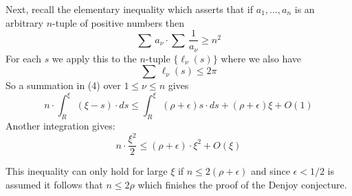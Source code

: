 \documentclass{amsart}
\def\uuu{_}
\def\vvv{-}
\begin{document}
\noindent
Next, recall the elementary inequality which asserts that if $a\uuu 1,\ldots,a\uuu n$
is an arbitrary $n$\vvv tuple of positive numbers then
\[
\sum\,a\uuu \nu\cdot \sum\, \frac{1}{a_\nu}\geq n^2
\tag{5}
\]
For each $s$ we apply this to the $n$\vvv tuple
$\{\ell\uuu \nu(s)\}$ where we also have
\[ 
\sum\,\ell\uuu \nu(s)\leq 2\pi
\] 
\noindent
So  a summation in (4) over $1\leq \nu\leq n$ gives
\[
n\cdot  \int_R^\xi\, (\xi-s)\cdot ds\leq
\int_R^\xi\, (\rho+\epsilon)s\cdot ds+(\rho+\epsilon)\xi+O(1)\tag{6}
\]
Another integration gives:
\[ 
n\cdot\frac{\xi^2}{2}\leq (\rho+\epsilon)\cdot \xi^2+O(\xi)\tag{7}
\]
\medskip

\noindent
This inequality can only hold for large $\xi$ if
$n\leq 2(\rho+\epsilon)$ and since  $\epsilon<1/2$ is assumed
it follows that 
$n\leq 2\rho$ which finishes the proof of the Denjoy conjecture.



\newpage
\end{document}
